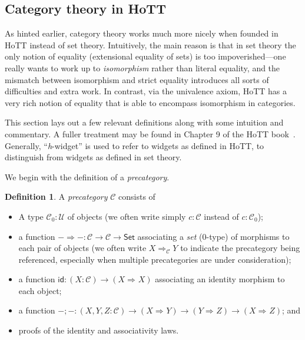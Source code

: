 \documentclass[preprint,authoryear]{sigplanconf}
\newcommand{\term}[1]{\emph{#1}}
\newcommand{\mcal}[1]{\ensuremath{\mathcal{#1}}}
\newcommand{\msf}[1]{\ensuremath{\mathsf{#1}}\xspace}
\theoremstyle{definition}
\newtheorem{defn}[thm]{Definition}
\theoremstyle{remark}
\newcommand{\Type}{\ensuremath{\mathcal{U}}}
\newcommand{\hott}[1]{\textit{h}-#1}
\newcommand{\homsymb}{\Rightarrow}
\providecommand{\hom}{}
\renewcommand{\hom}[3][]{#2 \homsymb_{#1} #3}
\newcommand{\CT}{\mcal{C}}
\newcommand{\SetT}{\msf{Set}}
\newcommand{\idT}{\msf{id}}
\newcommand{\then}{\mathbin{;}}                       %
\begin{document}
\subsection{Category theory in HoTT}
\label{sec:CT-HoTT}

As hinted earlier, category theory works much more nicely when founded
in HoTT instead of set theory.  Intuitively, the main reason is that
in set theory the only notion of equality (extensional equality of
sets) is too impoverished---one really wants to work up to
\emph{isomorphism} rather than literal equality, and the mismatch
between isomorphism and strict equality introduces all sorts of
difficulties and extra work.  In contrast, via the univalence axiom,
HoTT has a very rich notion of equality that is able to encompass
isomorphism in categories.

This section lays out a few relevant definitions along with some
intuition and commentary.  A fuller treatment may be found in Chapter
9 of the HoTT book~\citep{hottbook}.  Generally, ``\hott{widget}'' is
used to refer to widgets as defined in HoTT, to distinguish from
widgets as defined in set theory.

We begin with the definition of a \term{precategory}.

\begin{defn}
  A \term{precategory} $\CT$ consists of
  \begin{itemize}
  \item A type $\CT_0 : \Type$ of objects (we often write simply
    $c : \CT$ instead of $c : \CT_0$);
  \item a function $- \homsymb - : \CT \to \CT \to \SetT$ associating
    a \emph{set} ($0$-type) of morphisms to each pair of objects (we
    often write $\hom[\CT] X Y$ to indicate the precategory being
    referenced, especially when multiple precategories are under
    consideration);
  \item a function $\idT : (X : \CT) \to (\hom X X)$ associating
    an identity morphism to each object;
  \item a function $- \then - : (X,Y,Z : \CT) \to (\hom X Y) \to
    (\hom Y Z) \to (\hom X Z)$; and
  \item proofs of the identity and associativity laws.
  \end{itemize}
\end{defn}
\end{document}

